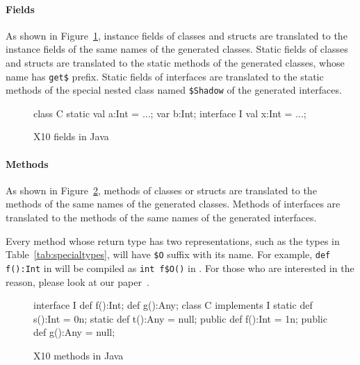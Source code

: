 \paragraph{Fields}

As shown in Figure~\ref{fig:fields}, instance fields of \Xten{} classes and structs are translated to the instance fields of the same names of the generated \Java{} classes.
Static fields of \Xten{} classes and structs are translated to the static methods of the generated \Java{} classes, whose name has \verb|get$| prefix.
Static fields of \Xten{} interfaces are translated to the static methods of the special nested class named \verb|$Shadow| of the generated \Java{} interfaces.

\begin{figure}
\begin{xten}
class C {
  static val a:Int = ...;
  var b:Int;
}
interface I {
  val x:Int = ...;
}
\end{xten}
\caption{X10 fields in Java}
\label{fig:fields}
\end{figure}


\paragraph{Methods}

As shown in Figure~\ref{fig:methods}, methods of \Xten{} classes or structs are translated to the methods of the same names of the generated \Java{} classes.
Methods of \Xten{} interfaces are translated to the methods of the same names of the generated \Java{} interfaces.

Every method whose return type has two representations, such as the types in Table~\ref{tab:specialtypes}, will have \verb|$O| suffix with its name.
For example, \verb|def f():Int| in \Xten{} will be compiled as \verb|int f$O()| in \Java{}.
For those who are interested in the reason, please look at our paper~\cite{TakeuchiX1012}.

\begin{figure}
\begin{xten}
interface I {
  def f():Int;
  def g():Any;
}
class C implements I {
  static def s():Int = 0n;
  static def t():Any = null;
  public def f():Int = 1n;
  public def g():Any = null;
}
\end{xten}
\caption{X10 methods in Java}
\label{fig:methods}
\end{figure}


